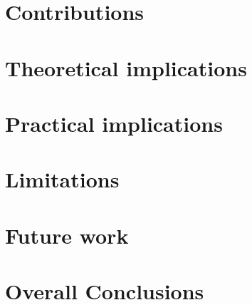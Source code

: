 
\section{Contributions}

\section{Theoretical implications}

\section{Practical implications}

\section{Limitations}

\section{Future work}

\section{Overall Conclusions}